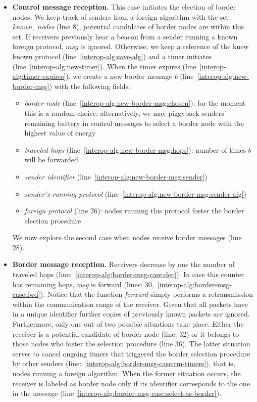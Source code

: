 \begin{itemize}

\item \textbf{Control message reception.}
%
This case initiates the election of border nodes.
%
We keep track of senders from a foreign algorithm with the set \textit{known\_nodes} (line 8), potential candidates of border nodes are within this set.
%
If receivers previously hear a beacon from a sender running a known foreign protocol, $msg$ is ignored.
%
Otherwise, we keep a reference of the knew known protocol (line~\ref{interop-alg:save-alg}) and a timer initiates (line~\ref{interop-alg:new-timer}).
%
When the timer expires (line~\ref{interop-alg:timer-expires}), we create a new border message \emph{b} (line~\ref{interop-alg:new-border-msg}) with the following fields:

\begin{itemize}

\item \textit{border node} (line~\ref{interop-alg:new-border-msg:chosen}): for the moment this is a random choice; alternatively, we may piggyback senders' remaining battery in control messages to select a border node with the highest value of energy
\item \textit{traveled hops} (line~\ref{interop-alg:new-border-msg:hops}): number of times $b$ will be forwarded
\item \textit{sender identifier} (line~\ref{interop-alg:new-border-msg:sender})
\item \textit{sender's running protocol} (line~\ref{interop-alg:new-border-msg:sender-alg})
\item \textit{foreign protocol} (line 26): nodes running this protocol foster the border election procedure 

\end{itemize}
%
We now explore the second case when nodes receive border messages (line 28).

\item \textbf{Border message reception.} Receivers decrease by one the number of traveled hops (line:~\ref{interop-alg:border-msg-case:dec}).
%
In case this counter has remaining hops, \textit{msg} is forward (lines: 30,~\ref{interop-alg:border-msg-case:fwd}).
%
Notice that the function \textit{forward} simply performs a retransmission within the communication range of the receiver.
%
Given that all packets have in a unique identifier further copies of previously known packets are ignored.
%
Furthermore, only one out of two possible situations take place.
%
Either the receiver is a potential candidate of border node (line: 32) or it belongs to those nodes who foster the selection procedure (line 36).
%
The latter situation serves to cancel ongoing timers that triggered the border selection procedure by other senders (line:~\ref{interop-alg:border-msg-case:rm-timers}), that is, nodes running a foreign algorithm.
%
When the former situation occurs, the receiver is labeled as border node only if its identifier corresponds to the one in the message (line~\ref{interop-alg:border-msg-case:select-as-border}).


\end{itemize}


